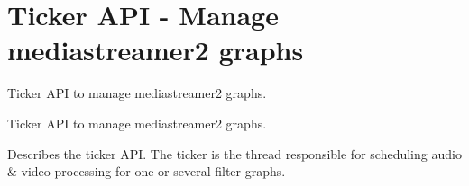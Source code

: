 \section{Ticker A\+PI -\/ Manage mediastreamer2 graphs}
\label{group__mediastreamer2__ticker}


Ticker A\+PI to manage mediastreamer2 graphs.  


Ticker A\+PI to manage mediastreamer2 graphs. 

Describes the ticker A\+PI. The ticker is the thread responsible for scheduling audio \& video processing for one or several filter graphs. 